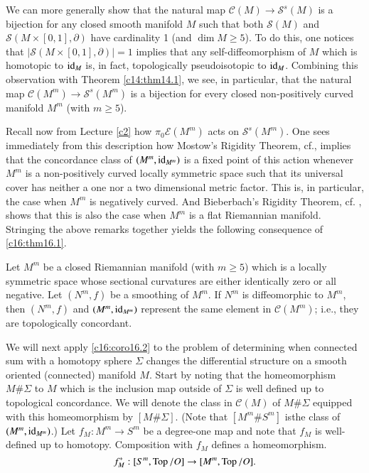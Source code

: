 We can more generally show that the natural map $\mathcal{C}(M)\to
\mathcal{S}^{s}(M)$ is a bijection for any closed smooth manifold $M$
such that both $\mathcal{S}(M)$ and $\mathcal{S}(M\times
[0,1],\partial)$ have cardinality 1 (and $\dim M\geq 5$). To do this,
one notices that $|\mathcal{S}(M\times [0,1],\partial)|=1$ implies
that any self-diffeomorphism of $M$ which is homotopic to $\operatorname{id}_{M}$
is, in fact, topologically pseudoisotopic to $\operatorname{id}_{M}$. Combining this
observation with Theorem \ref{c14:thm14.1}, we see, in particular,
that the natural map $\mathcal{C}(M^{m})\to \mathcal{S}^{s}(M^{m})$ is
a bijection for every closed non-positively curved manifold $M^{m}$
(with $m\geq 5$).

Recall now from Lecture \ref{c2} how $\pi_{0}\mathcal{E}(M^{m})$ acts
on $\mathcal{S}^{s}(M^{m})$. One sees immediately from this
description how Mostow's Rigidity Theorem, cf.\@ \cite{75}, implies
that the concordance class of $(M^{m},\operatorname{id}_{M^{m}})$ is a fixed point
of this action whenever $M^{m}$ is a non-positively curved locally
symmetric space such that its universal cover has neither a one nor a
two dimensional metric factor. This is, in particular, the case when
$M^{m}$ is negatively curved. And Bieberbach's Rigidity Theorem, cf.\@
\cite{6}, shows that this is also the case when $M^{m}$ is a flat
Riemannian manifold. Stringing the above remarks together yields the
following consequence of \ref{c16:thm16.1}.

\begin{coro}\label{c16:coro16.2}
Let $M^{m}$ be a closed Riemannian manifold (with $m\geq 5$) which is
a locally symmetric space whose sectional curvatures are either
identically zero or all negative. Let $(N^{m},f)$ be a smoothing of
$M^{m}$. If $N^{m}$ is diffeomorphic to $M^{m}$, then $(N^{m},f)$ and
$(M^{m},\operatorname{id}_{M^{m}})$ represent the same element in
$\mathcal{C}(M^{m})$; i.e., they are topologically concordant.
\end{coro}

We will next apply \ref{c16:coro16.2} to the problem of determining
when connected sum with a homotopy sphere $\Sigma$ changes the
differential structure on a smooth oriented (connected) manifold
$M$. Start by noting that the homeomorphism $M\# \Sigma$ to $M$ which
is the inclusion map outside of $\Sigma$ is well defined up to
topological concordance. We will denote the class in $\mathcal{C}(M)$
of $M\# \Sigma$ equipped with this homeomorphism by $[M\#
  \Sigma]$. (Note that $[M^{m}\# S^{m}]$ is\pageoriginale the class of
$(M^{m},\operatorname{id}_{M^{m}})$.) Let $f_{M}:M^{m}\to S^{m}$ be a degree-one map
and note that $f_{M}$ is well-defined up to homotopy. Composition with
$f_{M}$ defines a homeomorphism.
$$
f^{*}_{M}:[S^{m},\operatorname{Top}/O]\to [M^{m},\operatorname{Top}/O].
$$

